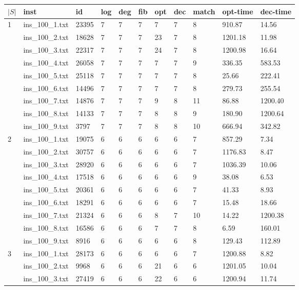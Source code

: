 \begin{table}[]
\begin{tabular}{lllllllllll}
 $|S|$ & inst & id & log & deg & fib & opt & dec & match & opt-time & dec-time \\
\hline 
\multirow{9}{*}{1}
& ins\_100\_1.txt & 23395 & 7 & 7 & 7 &7   & 7 & 8 & 910.87 &	14.56	\\
& ins\_100\_2.txt & 18628 & 7 & 7 & 7 &23  & 7 & 8 &1201.18 &	11.98	\\
& ins\_100\_3.txt & 22317 & 7 & 7 & 7 &24  & 7 & 8 &1200.98 &	16.64	\\
& ins\_100\_4.txt & 26058 & 7 & 7 & 7 &7   & 7 & 9 & 336.35 &	583.53	 \\
& ins\_100\_5.txt & 25118 & 7 & 7 & 7 &7   & 7 & 8 &  25.66 &	222.41	 \\
& ins\_100\_6.txt & 14496 & 7 & 7 & 7 &7   & 7 & 8 & 279.73 &	255.54	 \\
& ins\_100\_7.txt & 14876 & 7 & 7 & 7 &9   & 8 & 11 &  86.88 &	1200.40	\\
& ins\_100\_8.txt & 14133 & 7 & 7 & 7 &8   & 8 & 9 & 180.90 &	1200.64	\\
& ins\_100\_9.txt & 3797  & 7 & 7 & 7 &8   & 8 & 10 & 666.94 &	342.82	\\
\hline 
\multirow{9}{*}{2}
& ins\_100\_1.txt & 19075 & 6 & 6 & 6 & 6  & 6  & 7 &857.29	&7.34	\\
& ins\_100\_2.txt & 30757 & 6 & 6 & 6 & 6  & 6  & 7 &1176.83	&8.47	\\
& ins\_100\_3.txt & 28920 & 6 & 6 & 6 & 6  & 6  & 7 &1036.39	&10.06	\\
& ins\_100\_4.txt & 17518 & 6 & 6 & 6 & 6  & 6  & 9 &38.08	&6.53	\\
& ins\_100\_5.txt & 20361 & 6 & 6 & 6 & 6  & 6  & 7 &41.33	&8.93	\\
& ins\_100\_6.txt & 18291 & 6 & 6 & 6 & 6  & 6  & 7 &15.48	&18.66	\\
& ins\_100\_7.txt & 21324 & 6 & 6 & 6 & 8  & 7  & 10&14.22	&1200.38	\\
& ins\_100\_8.txt & 16586 & 6 & 6 & 6 & 7  & 7  & 8 &6.59	&160.01	\\
& ins\_100\_9.txt & 8916  & 6 & 6 & 6 & 6  & 6  & 8 &129.43	&112.89	\\
\hline 
\multirow{9}{*}{3}
& ins\_100\_1.txt & 28173 & 6 & 6 & 6 & 6  & 6  & 7 &1200.88&	8.82	\\
& ins\_100\_2.txt & 9968  & 6 & 6 & 6 & 21 & 6  & 6 &1201.05&	10.04	\\
& ins\_100\_3.txt & 27419 & 6 & 6 & 6 & 22 & 6  & 6 &1200.94&	11.74	\\

\end{tabular}
\end{table}
